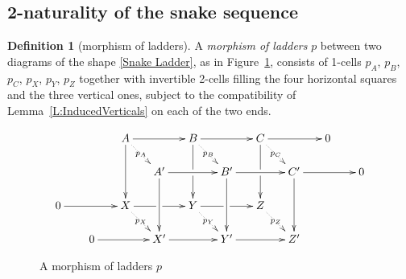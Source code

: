 \documentclass[reqno,a4paper]{amsart}
\numberwithin{equation}{section}
\theoremstyle{plain}
\theoremstyle{definition}
\newtheorem{definition}[subsection]{Definition}
\def\nameit#1{\textrm{#1}~}
\def\lemx{\nameit{Lemma}}
\def\dfn#1{{\itshape #1}}
\renewcommand{\1}{\onecat{1}}
\begin{document}
\subsection{2-naturality of the snake sequence}\label{SS:NaturalSnake}

\begin{definition}[morphism of ladders]\label{Def:MorphismLadder}
	A \dfn{morphism of ladders} \(p\) between two diagrams of the shape \eqref{Snake Ladder}, as in Figure~\ref{Figure Morphism of diagrams}, consists of 1-cells \(p_A\), \(p_B\), \(p_C\), \(p_X\), \(p_Y\), \(p_Z\) together with invertible 2-cells filling the four horizontal squares and the three vertical ones, subject to the compatibility of \lemx\ref{L:InducedVerticals} on each of the two ends.
\end{definition}

\begin{figure}
	\begin{equation*}
		\xymatrix@!0@=3em{
		&& A \ar@{.>}[rd]|-{{p}_A} \ar[dd] \ar[rr] &&
		B \ar@{.>}[rd]|-{{p}_B} \ar[dd]|(.5){\hole} \ar[rr] &&
		C \ar@{.>}[rd]|-{{p}_C} \ar[dd]|(.5){\hole} \ar[rr] &&
		0 \\
		&&& A' \ar[dd] \ar[rr] &&
		B' \ar[dd] \ar[rr] &&
		C' \ar[dd] \ar[rr] &&
		0 \\
		0 \ar[rr] &&
		X \ar@{.>}[rd]|-{{p}_X} \ar[rr]|(.5){\hole} &&
		Y \ar@{.>}[rd]|-{{p}_Y} \ar[rr]|(.5){\hole} &&
		Z\ar@{.>}[rd]|-{{p}_Z}\\
		&0 \ar[rr] &&
		X' \ar[rr] &&
		Y' \ar[rr] &&
		Z'}
	\end{equation*}
	\caption{A morphism of ladders \({p}\)}\label{Figure Morphism of diagrams}
\end{figure}
\end{document}

